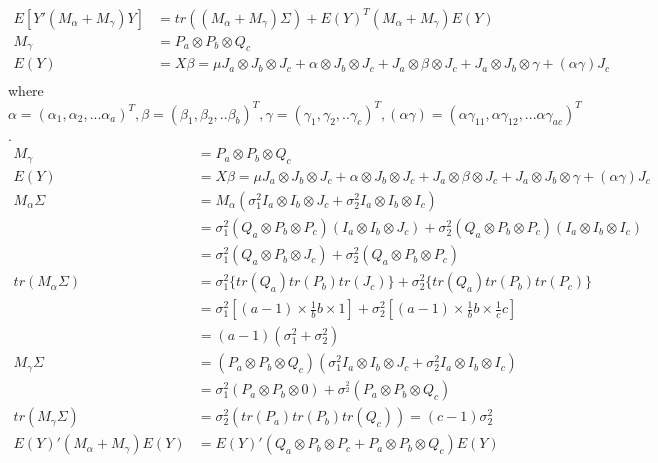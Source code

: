 \begin{itemize}
\begin{align*}
E[Y'(M_{\alpha} + M_{\gamma})Y] &= tr \left((M_{\alpha} + M_{\gamma})\Sigma \right) + E(Y)^T(M_{\alpha} + M_{\gamma}) E(Y)\\
M_{\gamma} &= P_a \otimes P_b \otimes Q_c\\
E(Y) &= X\beta = \mu J_a \otimes J_b \otimes J_c + \alpha \otimes J_b \otimes J_c + J_a \otimes \beta \otimes J_c + J_a \otimes J_b \otimes \gamma + (\alpha\gamma) J_c\\
\end{align*} 
where $\alpha = (\alpha_1, \alpha_2,... \alpha_a)^T, \beta = (\beta_1, \beta_2,.. \beta_b)^T, \gamma = (\gamma_1, \gamma_2, .. \gamma_c)^T, (\alpha\gamma) = (\alpha\gamma_{11}, \alpha\gamma_{12}, ... \alpha\gamma_{ac})^T$.\\
\begin{align*}
M_{\gamma} &= P_a \otimes P_b \otimes Q_c\\
E(Y) &= X\beta = \mu J_a \otimes J_b \otimes J_c + \alpha \otimes J_b \otimes J_c + J_a \otimes \beta \otimes J_c + J_a \otimes J_b \otimes \gamma + (\alpha\gamma) J_c\\
M_{\alpha}\Sigma &= M_{\alpha} (\sigma_1^2 I_a \otimes I_b \otimes J_c + \sigma_2^2 I_a \otimes I_b \otimes I_c) \\
&= \sigma_1^2 (Q_a \otimes P_b \otimes P_c) (I_a \otimes I_b \otimes J_c) + \sigma_2^2 (Q_a \otimes P_b \otimes P_c) (I_a \otimes I_b \otimes I_c)\\
&= \sigma_1^2 (Q_a \otimes P_b \otimes J_c) + \sigma_2^2 (Q_a \otimes P_b \otimes P_c)\\
tr(M_{\alpha}\Sigma) &= \sigma_1^2 \{ tr(Q_a) tr(P_b) tr(J_c) \} + \sigma_2^2 \{ tr(Q_a) tr(P_b) tr(P_c)\}\\
&= \sigma_1^2 [(a-1) \times \frac{1}{b} b \times 1] + \sigma_2^2 [(a-1) \times \frac{1}{b} b \times \frac{1}{c} c]\\
&= (a-1)(\sigma_1^2 + \sigma_2^2)\\
M_{\gamma}\Sigma &= (P_a \otimes P_b \otimes Q_c) (\sigma_1^2 I_a \otimes I_b \otimes J_c + \sigma_2^2 I_a \otimes I_b \otimes I_c)\\
&= \sigma_1^2(P_a \otimes P_b \otimes 0) + \sigma^_2^2 (P_a \otimes P_b \otimes Q_c)\\
tr(M_{\gamma} \Sigma) &= \sigma_2^2 (tr(P_a) tr(P_b) tr(Q_c)) = (c-1) \sigma_2^2\\
E(Y)'(M_{\alpha}+ M_{\gamma})E(Y) &= E(Y)'(Q_a \otimes P_b \otimes P_c + P_a \otimes P_b \otimes Q_c) E(Y) \\
\end{align*} 



\end{itemize}

